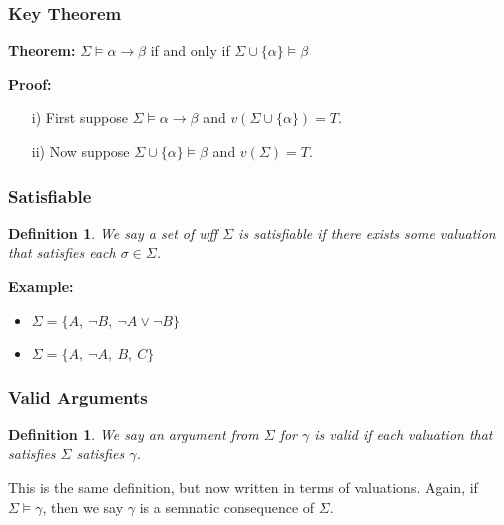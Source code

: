\documentclass{beamer}
\theoremstyle{indentDefn} \newtheorem{defn}[]{Definition}
\begin{document}
\begin{frame}
	\frametitle{Key Theorem}
	
	
	{\bf Theorem:} $\Sigma \vDash \alpha \rightarrow \beta$ if and only if $\Sigma \cup \{\alpha\} \vDash \beta$

	{\bf Proof:} 
	
	
	\begin{itemize}
		\item [i)] First suppose $\Sigma \vDash \alpha \rightarrow \beta$ and $v(\Sigma \cup \{\alpha\}) = T$. \vspace{3cm}
		
		\item[ii)] Now suppose  $\Sigma \cup \{\alpha\} \vDash \beta$ and $v(\Sigma) = T$.\vspace{2.5cm}
	\end{itemize}



	
\end{frame}

\begin{frame}
	\frametitle{Satisfiable}
	
	\begin{defn} We say a set of wff $\Sigma$ is satisfiable if there exists some valuation that satisfies each $\sigma \in \Sigma$. 
	\end{defn}

	\vspace{0.2cm}
	
	{\bf Example: }
		\begin{itemize}
			\item $\Sigma = \{A, \ \lnot B, \ \lnot A \lor \lnot B\}$
			
			\item $\Sigma = \{A, \ \lnot A, \ B, \ C\}$
		\end{itemize}
	
	
\end{frame}

\begin{frame}
	\frametitle{Valid Arguments}
	
		\begin{defn} 
			We say an argument from $\Sigma$ for $\gamma$ is valid if each valuation that satisfies $\Sigma$ satisfies $\gamma$. 
		\end{defn}
	
		This is the same definition, but now written in terms of valuations. Again, if $\Sigma \vDash \gamma$, then we say $\gamma$ is a semnatic consequence of $\Sigma$.  
	
	
\end{frame}
\end{document}
